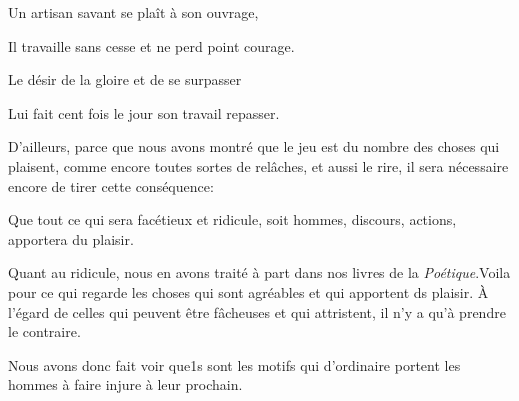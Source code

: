 \begin{emphpar}
	Un artisan savant se plaît à son ouvrage,

	Il travaille sans cesse et ne perd point courage.

	Le désir de la gloire et de se surpasser

	Lui fait cent fois le jour son travail repasser.
\end{emphpar}

\bigbreak

D'ailleurs, parce que nous avons montré que le jeu est du nombre des choses qui plaisent, comme encore toutes
sortes de relâches, et aussi le rire, il sera nécessaire encore de tirer cette conséquence:

\begin{lieu}
	Que tout ce qui sera facétieux et ridicule, soit hommes, discours, actions, apportera du plaisir.
\end{lieu}

Quant au ridicule, nous en avons traité à part dans nos livres de la \emph{Poétique}.Voila pour ce qui regarde
les choses qui sont agréables et qui apportent ds plaisir. À l'égard de celles qui peuvent être fâcheuses et qui
attristent, il n'y a qu'à prendre le contraire.

\bigbreak

Nous avons donc fait voir que1s sont les motifs qui d'ordinaire portent les hommes à faire injure à leur prochain.
